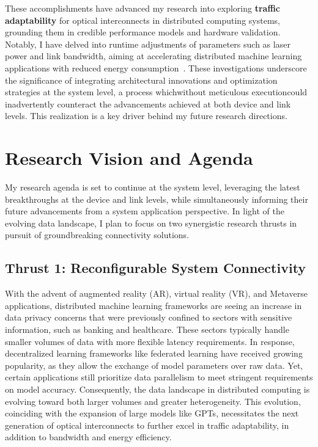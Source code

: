These accomplishments have advanced my research into exploring \textbf{traffic adaptability} for optical interconnects in distributed computing systems, grounding them in credible performance models and hardware validation. Notably, I have delved into runtime adjustments of parameters such as laser power and link bandwidth, aiming at accelerating distributed machine learning applications with reduced energy consumption~\cite{wangTaskMappingAssistedLaser2019,wangTrafficAdaptivePowerReconfiguration2021,brianJOCN}. These investigations underscore the significance of integrating architectural innovations and optimization strategies at the system level, a process which\textemdash without meticulous execution\textemdash could inadvertently counteract the advancements achieved at both device and link levels. This realization is a key driver behind my future research directions.

\section{Research Vision and Agenda}
My research agenda is set to continue at the system level, leveraging the latest breakthroughs at the device and link levels, while simultaneously informing their future advancements from a system application perspective. In light of the evolving data landscape, I plan to focus on two synergistic research thrusts in pursuit of groundbreaking connectivity solutions.

\subsection{Thrust 1: Reconfigurable System Connectivity}

With the advent of augmented reality (AR), virtual reality (VR), and Metaverse applications, distributed machine learning frameworks are seeing an increase in data privacy concerns that were previously confined to sectors with sensitive information, such as banking and healthcare. These sectors typically handle smaller volumes of data with more flexible latency requirements. In response, decentralized learning frameworks like federated learning have received growing popularity, as they allow the exchange of model parameters over raw data. Yet, certain applications still prioritize data parallelism to meet stringent requirements on model accuracy. Consequently, the data landscape in distributed computing is evolving toward both larger volumes and greater heterogeneity. This evolution, coinciding with the expansion of large models like GPTs, necessitates the next generation of optical interconnects to further excel in traffic adaptability, in addition to bandwidth and energy efficiency.

